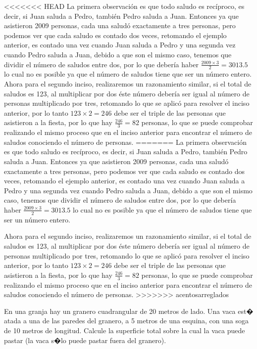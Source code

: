 \begin{Solucion}
<<<<<<< HEAD
  La primera observaci\'on es que todo saludo es rec\'iproco, es decir, si Juan saluda a Pedro, tambi\'en
Pedro saluda a Juan. Entonces ya que asistieron 2009 personas, cada una salud\'o exactamente a tres personas,
pero podemos ver que cada saludo es contado dos veces, retomando el ejemplo anterior, es contado una vez cuando Juan
saluda a Pedro y una segunda vez cuando Pedro saluda a Juan, debido a que son el mismo caso, tenemos que dividir el
n\'umero de saludos entre dos, por lo que deber\'ia haber $\tfrac{2009\times 3}{2}=3013.5$ lo cual no es posible ya
que el n\'umero de saludos tiene que ser un n\'umero entero.
Ahora para el segundo inciso, realizaremos un razonamiento similar, si el total de saludos es 123, al multiplicar por
dos \'este n\'umero deber\'ia ser igual al n\'umero de personas multiplicado por tres, retomando lo que se aplic\'o para
resolver el inciso anterior, por lo tanto $123\times 2=246$ debe ser el triple de las personas que asistieron a la
fiesta, por lo que hay $\tfrac{246}{3}=82$ personas, lo que se puede comprobar realizando el mismo proceso que en el
inciso anterior para encontrar el n\'umero de saludos conociendo el n\'umero de personas.
=======
  La primera observaci\'on es que todo saludo es rec\'iproco, es
  decir, si Juan saluda a Pedro, tambi\'en Pedro saluda a
  Juan. Entonces ya que asistieron 2009 personas, cada una salud\'o
  exactamente a tres personas, pero podemos ver que cada saludo es
  contado dos veces, retomando el ejemplo anterior, es contado una vez
  cuando Juan saluda a Pedro y una segunda vez cuando Pedro saluda a
  Juan, debido a que son el mismo caso, tenemos que dividir el
  n\'umero de saludos entre dos, por lo que deber\'ia haber
  $\tfrac{2009\times 3}{2}=3013.5$ lo cual no es posible ya que el
  n\'umero de saludos tiene que ser un n\'umero entero.

  Ahora para el segundo inciso, realizaremos un razonamiento similar,
  si el total de saludos es 123, al multiplicar por dos \'este
  n\'umero deber\'ia ser igual al n\'umero de personas multiplicado
  por tres, retomando lo que se aplic\'o para resolver el inciso
  anterior, por lo tanto $123\times 2=246$ debe ser el triple de las
  personas que asistieron a la fiesta, por lo que hay
  $\tfrac{246}{3}=82$ personas, lo que se puede comprobar realizando
  el mismo proceso que en el inciso anterior para encontrar el
  n\'umero de saludos conociendo el n\'umero de personas.
>>>>>>> acentosarreglados
\end{Solucion}

\begin{Problema}{6}
  En una granja hay un granero cuadrangular de 20 metros de lado. Una
  vaca est� atada a una de las paredes del granero, a 5 metros de una
  esquina, con una soga de 10 metros de longitud.  Calcule la
  superficie total sobre la cual la vaca puede pastar (la vaca s�lo
  puede pastar fuera del granero).
\end{Problema}

\begin{Solucion}
  
\end{Solucion}

